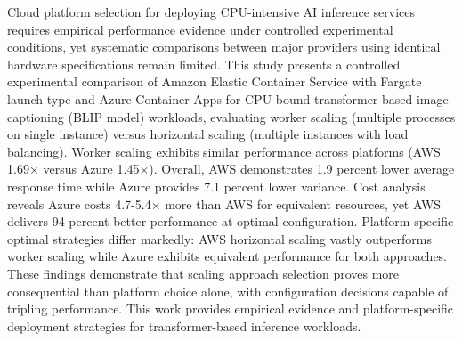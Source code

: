 Cloud platform selection for deploying CPU-intensive AI inference services requires empirical performance evidence under controlled experimental conditions, yet systematic comparisons between major providers using identical hardware specifications remain limited. This study presents a controlled experimental comparison of Amazon Elastic Container Service with Fargate launch type and Azure Container Apps for CPU-bound transformer-based image captioning (BLIP model) workloads, evaluating worker scaling (multiple processes on single instance) versus horizontal scaling (multiple instances with load balancing). Worker scaling exhibits similar performance across platforms (AWS 1.69× versus Azure 1.45×). Overall, AWS demonstrates 1.9 percent lower average response time while Azure provides 7.1 percent lower variance. Cost analysis reveals Azure costs 4.7-5.4× more than AWS for equivalent resources, yet AWS delivers 94 percent better performance at optimal configuration. Platform-specific optimal strategies differ markedly: AWS horizontal scaling vastly outperforms worker scaling while Azure exhibits equivalent performance for both approaches. These findings demonstrate that scaling approach selection proves more consequential than platform choice alone, with configuration decisions capable of tripling performance. This work provides empirical evidence and platform-specific deployment strategies for transformer-based inference workloads.
